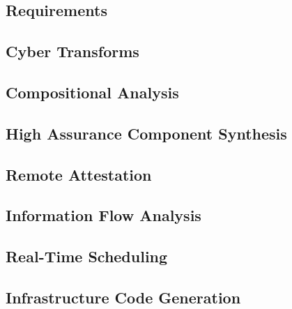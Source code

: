 \documentclass{IEEEcsmag}
\begin{document}
\subsection{Requirements}


\subsection{Cyber Transforms}


\subsection{Compositional Analysis}


\subsection{High Assurance Component Synthesis}


\subsection{Remote Attestation}


\subsection{Information Flow Analysis}
\label{subsec:info-flow}


\subsection{Real-Time Scheduling}


\subsection{Infrastructure Code Generation}
\label{subsec:hamr}


\end{document}
